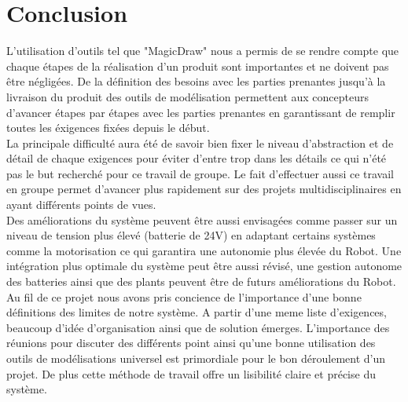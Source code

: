 \section{Conclusion}

L'utilisation d'outils tel que "MagicDraw" nous a permis de se rendre compte que chaque étapes
de la réalisation d'un produit sont importantes et ne doivent pas être négligées. De la définition
des besoins avec les parties prenantes jusqu'à la livraison du produit des outils de modélisation
permettent aux concepteurs d'avancer étapes par étapes avec les parties prenantes en garantissant
de remplir toutes les éxigences fixées depuis le début.\\

La principale difficulté aura été de savoir bien fixer le niveau d'abstraction et de détail de chaque
exigences pour éviter d'entre trop dans les détails ce qui n'été pas le but recherché pour ce travail
de groupe. Le fait d'effectuer aussi ce travail en groupe permet d'avancer plus rapidement sur des
projets multidisciplinaires en ayant différents points de vues.\\

Des améliorations du système peuvent être aussi envisagées comme passer sur un niveau de tension plus 
élevé (batterie de 24V) en adaptant certains systèmes comme la motorisation ce qui garantira une 
autonomie plus élevée du Robot. Une intégration plus optimale du système peut être aussi révisé, une 
gestion autonome des batteries ainsi que des plants peuvent être de futurs améliorations du Robot.\\

Au fil de ce projet nous avons pris concience de l'importance d'une bonne définitions
des limites de notre système. A partir d'une meme liste d'exigences, beaucoup d'idée 
d'organisation ainsi que de solution émerges. L'importance des réunions pour discuter
des différents point ainsi qu'une bonne utilisation des outils de modélisations universel est primordiale pour
le bon déroulement d'un projet. De plus cette méthode de travail offre un lisibilité claire et précise du système.

